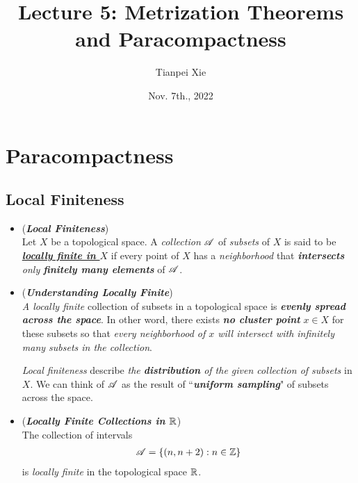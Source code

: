 \documentclass[11pt]{article}
\begin{document}
\title{Lecture 5: Metrization Theorems and Paracompactness}
\author{ Tianpei Xie}
\date{Nov. 7th., 2022}
\maketitle
\tableofcontents
\newpage
\section{Paracompactness}
\subsection{Local Finiteness}
\begin{itemize}
\item \begin{definition} (\emph{\textbf{Local Finiteness}})\\
Let $X$ be a topological space. A \emph{collection} ${\mathscr A}$ of \emph{subsets} of $X$ is said to be \underline{\emph{\textbf{locally finite in $X$}}} if every point of $X$ has a \emph{neighborhood} that \emph{\textbf{intersects} only \textbf{finitely many elements}} of ${\mathscr A}$.
\end{definition}

\item \begin{remark} (\emph{\textbf{Understanding Locally Finite}})\\
\emph{A locally finite} collection of subsets in a topological space is \emph{\textbf{evenly spread across the space}}. In other word, there exists \emph{\textbf{no cluster point}} $x \in X$ for these subsets so that \emph{every neighborhood of $x$ will intersect with infinitely many subsets in the collection}.

\emph{Local finiteness} describe \emph{the \textbf{distribution} of the given collection of subsets} in $X$. We can think of ${\mathscr A}$ as the result of ``\emph{\textbf{uniform sampling}}" of subsets across the space.
\end{remark}

\item \begin{example} (\emph{\textbf{Locally Finite Collections in ${\mathbb R}$}})\\
The collection of intervals
\begin{align*}
{\mathscr A} = \{(n, n + 2): n \in {\mathbb Z}\}
\end{align*}
is \emph{locally finite} in the topological space ${\mathbb R}$.


\end{example}
\end{itemize}
\end{document}
